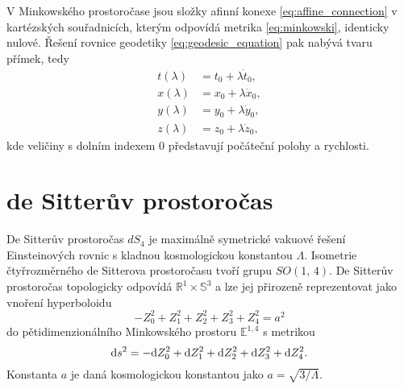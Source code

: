 V Minkowského prostoročase jsou složky afinní konexe \eqref{eq:affine_connection} v kartézských souřadnicích,
kterým odpovídá metrika \eqref{eq:minkowski}, identicky nulové. Řešení rovnice geodetiky \eqref{eq:geodesic_equation} pak
nabývá tvaru přímek, tedy
\begin{equation}
     \label{eq:minkowski_cartesian_geodesics}
     \begin{split}
     t(\lambda) &= t_0 + \lambda {\dot t}_0, \\
     x(\lambda) &= x_0 + \lambda {\dot x}_0, \\
     y(\lambda) &= y_0 + \lambda {\dot y}_0, \\
     z(\lambda) &= z_0 + \lambda {\dot z}_0,
     \end{split}
\end{equation}
kde veličiny s dolním indexem $0$ představují počáteční polohy a rychlosti.


\section{de Sitterův prostoročas}

De Sitterův prostoročas $dS_4$ je maximálně symetrické vakuové řešení Einsteinových rovnic s kladnou kosmologickou
konstantou $\Lambda$. Isometrie čtyřrozměrného de Sitterova prostoročasu tvoří grupu $SO(1,\,4)$. De Sitterův prostoročas topologicky odpovídá
$\mathbb{R}^1 \times \mathbb{S}^3$ a lze jej přirozeně reprezentovat jako vnoření hyperboloidu
\begin{equation}
     \label{eq:dS_hyperboloid}
     - Z_0^2 + Z_1^2 + Z_2^2 + Z_3^2 + Z_4^2 = a^2
\end{equation}
do pětidimenzionálního Minkowského prostoru $\mathbb{E}^{1,4}$ s metrikou
\begin{equation}
     \label{eq:5d_minkowski}
     \mathrm{d} s^2 = - \mathrm{d} Z_0^2 + \mathrm{d} Z_1^2 + \mathrm{d} Z_2^2 + \mathrm{d} Z_3^2 + \mathrm{d} Z_4^2.
\end{equation}
Konstanta $a$ je daná kosmologickou konstantou jako $a = \sqrt{3/\Lambda}$.

